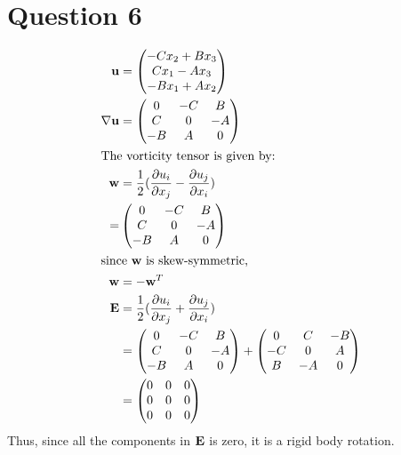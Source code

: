 \documentclass[12pt]{article} %
\begin{document}
\section{Question 6}
\begin{align*}
    \mathbf{u} &= \begin{pmatrix}
        -C x_2 + B x_3 \\
        C x_1 - A x_3 \\
        -B x_1 + A x_2 \\
        \end{pmatrix} \\
    \nabla \mathbf{u} &= \begin{pmatrix}
        0 & -C & B \\
        C & 0 & -A \\
        -B & A & 0 \\
        \end{pmatrix} \\
        \intertext{The vorticity tensor is given by:}
    \mathbf{w} &= \frac{1}{2}(\frac{\partial u_i}{\partial x_j} - \frac{\partial u_j}{\partial x_i})\\
    =& \begin{pmatrix}
        0 & -C & B \\
        C & 0 & -A \\
        -B & A & 0 \\
        \end{pmatrix} \\
        \intertext{since $\mathbf{w}$ is skew-symmetric,}
    \mathbf{w} &= -\mathbf{w}^T \\
    \mathbf{E} &= \frac{1}{2}(\frac{\partial u_i}{\partial x_j} + \frac{\partial u_j}{\partial x_i}) \\
    &= \begin{pmatrix}
        0 & -C & B \\
        C & 0 & -A \\
        -B & A & 0 \\
        \end{pmatrix} + \begin{pmatrix}
            0 & C & -B \\
            -C & 0 & A \\
            B & -A & 0 \\
            \end{pmatrix} \\
            &= \begin{pmatrix}
                0 & 0 & 0 \\
                0 & 0 & 0 \\
                0 & 0 & 0 \\
                \end{pmatrix}
\end{align*}
Thus, since all the components in $\mathbf{E}$ is zero, it is a rigid body rotation.
\end{document}
